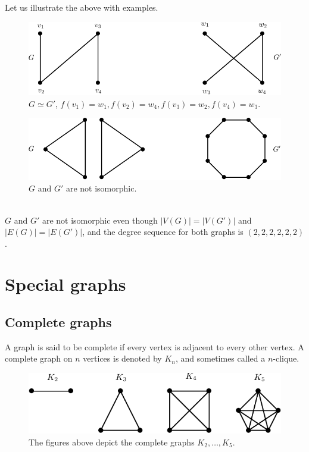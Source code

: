 \documentclass[12pt,a4paper]{article}
\theoremstyle{definition}
\begin{document}
Let us illustrate the above with examples. 
\begin{figure}[hbtp]
\centering
\includegraphics[scale=1]{images/graph7.pdf}
\caption{$G \simeq G'$, $f(v_1)=w_1, f(v_2)=w_4, f(v_3)=w_2, f(v_4)=w_3$.}
\end{figure}
\begin{figure}[hbtp]
\centering
\includegraphics[scale=1]{images/graph8.pdf}
\caption{$G$ and $G'$ are not isomorphic.}
\end{figure}
\\
$G$ and $G'$ are not isomorphic even though $|V(G)|=|V(G')|$ and $|E(G)|=|E(G')|$, and the degree sequence for both graphs is $(2,2,2,2,2,2)$.
\newpage
\section{Special graphs}
\subsection{Complete graphs}
A graph is said to be complete if every vertex is adjacent to every other vertex. A complete graph on $n$ vertices is denoted by $K_n$, and sometimes called a $n$-clique.
\begin{figure}[hbtp]
\centering
\includegraphics[scale=1]{images/graph9.pdf}
\caption{The figures above depict the complete graphs $K_2, \dots , K_5$.}
\end{figure}
\end{document}
